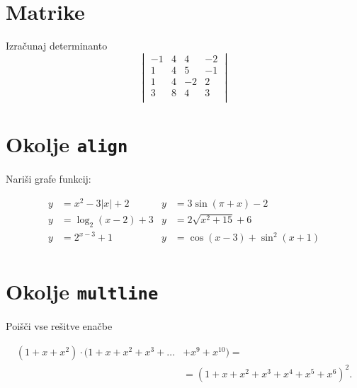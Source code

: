 \documentclass[a4paper,12pt]{article}
\begin{document}
\section*{Matrike}
Izračunaj determinanto
\begin{equation*}  
   \begin{vmatrix}
      -1 & 4 & 4 & -2 \\
      1 & 4 & 5 & -1 \\
      1 & 4 & -2 & 2 \\
      3 & 8 & 4 & 3 \\
   \end{vmatrix}
\end{equation*}
\section*{Okolje \texttt{align}}
Nariši grafe funkcij:


\begin{align*}
   y &= x^2 - 3|x| + 2  &  y &= 3 \sin(\pi+x) - 2 \\
   y &= \log_2(x-2) + 3 &  y &= 2 \sqrt{x^2+15} + 6 \\
   y &= 2^{x-3} + 1    &   y &= \cos(x-3) + \sin^2(x+1) \\
\end{align*}

\section*{Okolje \texttt{multline}}
Poišči vse rešitve enačbe

\begin{align*}
   (1+x+x^2) \cdot (1+x+x^2+x^3+\ldots&+x^9+x^{10}) =\\
   &=(1+x+x^2+x^3+x^4+x^5+x^6)^2.
\end{align*}
\end{document}
